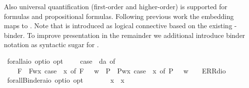 \begin{isabellebody}
\begin{isamarkuptext}%
Also universal quantification  (first-order and higher-order) is supported 
 for formulas  and propositional formulas. Following previous work the embedding maps 
  to . Note that \isa{\isactrlbold {\isasymforall}} is introduced as logical connective
 based on the existing \isa{{\isasymlambda}}-binder. To improve presentation in the remainder we additional
 introduce binder notation  as syntactic sugar for .%
\end{isamarkuptext}%
\isamarkuptrue%
\isamarkupfalse%
\ forall{\isacharcolon}{\isacharcolon}{\isachardoublequoteopen}{\isacharparenleft}{\isacharprime}a{\isasymRightarrow}io\ opt{\isacharparenright}{\isasymRightarrow}io\ opt{\isachardoublequoteclose}{\isacharparenleft}{\isachardoublequoteopen}\isactrlbold {\isasymforall}{\isachardoublequoteclose}{\isacharparenright}\ \ {\isachardoublequoteopen}\isactrlbold {\isasymforall}\ {\isasymPhi}\ {\isasymequiv}\ case\ {\isacharparenleft}{\isasymPhi}\ da{\isacharparenright}\ of\isanewline
\ \ \ \ F{\isacharparenleft}{\isasymphi}{\isacharparenright}\ {\isasymRightarrow}\ F{\isacharparenleft}{\isasymlambda}w{\isachardot}{\isasymforall}x{\isachardot}\ case\ {\isacharparenleft}{\isasymPhi}\ x{\isacharparenright}\ of\ F{\isacharparenleft}{\isasympsi}{\isacharparenright}\ {\isasymRightarrow}\ {\isasympsi}\ w{\isacharparenright}\ {\isacharbar}\ P{\isacharparenleft}{\isasymphi}{\isacharparenright}\ {\isasymRightarrow}\ P{\isacharparenleft}{\isasymlambda}w{\isachardot}{\isasymforall}x{\isachardot}\ case\ {\isacharparenleft}{\isasymPhi}\ x{\isacharparenright}\ of\ P{\isacharparenleft}{\isasympsi}{\isacharparenright}\ {\isasymRightarrow}\ {\isasympsi}\ w{\isacharparenright}\ {\isacharbar}\ {\isacharunderscore}\ {\isasymRightarrow}\ ERR{\isacharparenleft}dio{\isacharparenright}{\isachardoublequoteclose}\isanewline
{}\isamarkupfalse%
\ forallBinder{\isacharcolon}{\isacharcolon}{\isachardoublequoteopen}{\isacharparenleft}{\isacharprime}a{\isasymRightarrow}io\ opt{\isacharparenright}{\isasymRightarrow}io\ opt{\isachardoublequoteclose}\ {\isacharparenleft}\ {\isachardoublequoteopen}\isactrlbold {\isasymforall}{\isachardoublequoteclose}\ {\isacharbrackleft}{}{\isacharbrackright}\ {}{\isacharparenright}\ \ \ {\isachardoublequoteopen}\isactrlbold {\isasymforall}\ x{\isachardot}\ {\isasymphi}\ x\ {\isasymequiv}\ \isactrlbold {\isasymforall}\ {\isasymphi}{\isachardoublequoteclose}\isanewline

\end{isabellebody}
